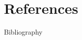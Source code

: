 \section{References}

\label{sec:bibliography}
\begin{frame}[allowframebreaks]{Bibliography}
    \printbibliography
\end{frame}

